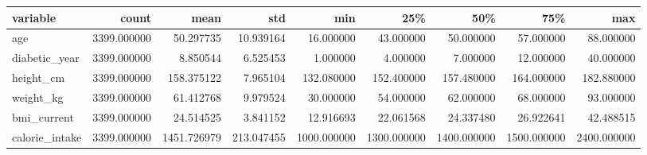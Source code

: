 \begin{tabular}{lrrrrrrrr}
\toprule
variable & count & mean & std & min & 25\% & 50\% & 75\% & max \\
\midrule
age & 3399.000000 & 50.297735 & 10.939164 & 16.000000 & 43.000000 & 50.000000 & 57.000000 & 88.000000 \\
diabetic\_year & 3399.000000 & 8.850544 & 6.525453 & 1.000000 & 4.000000 & 7.000000 & 12.000000 & 40.000000 \\
height\_cm & 3399.000000 & 158.375122 & 7.965104 & 132.080000 & 152.400000 & 157.480000 & 164.000000 & 182.880000 \\
weight\_kg & 3399.000000 & 61.412768 & 9.979524 & 30.000000 & 54.000000 & 62.000000 & 68.000000 & 93.000000 \\
bmi\_current & 3399.000000 & 24.514525 & 3.841152 & 12.916693 & 22.061568 & 24.337480 & 26.922641 & 42.488515 \\
calorie\_intake & 3399.000000 & 1451.726979 & 213.047455 & 1000.000000 & 1300.000000 & 1400.000000 & 1500.000000 & 2400.000000 \\
\bottomrule
\end{tabular}
